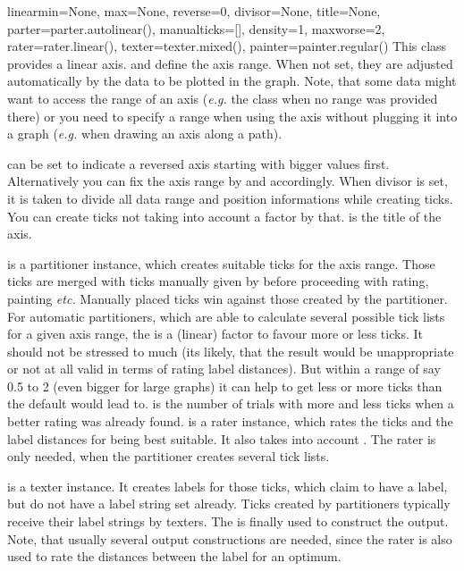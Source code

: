 \begin{classdesc}{linear}{min=None, max=None, reverse=0, divisor=None, title=None,
                          parter=parter.autolinear(), manualticks=[],
                          density=1, maxworse=2, rater=rater.linear(),
                          texter=texter.mixed(), painter=painter.regular()}
  This class provides a linear axis.  and  define the
  axis range. When not set, they are adjusted automatically by the
  data to be plotted in the graph. Note, that some data might want to
  access the range of an axis (\emph{e.g.} the  class
  when no range was provided there) or you need to specify a range
  when using the axis without plugging it into a graph (\emph{e.g.}
  when drawing an axis along a path).

   can be set to indicate a reversed axis starting with
  bigger values first. Alternatively you can fix the axis range by
   and  accordingly. When divisor is set, it is
  taken to divide all data range and position informations while
  creating ticks. You can create ticks not taking into account a
  factor by that.  is the title of the axis.

   is a partitioner instance, which creates suitable ticks
  for the axis range. Those ticks are merged with ticks manually given 
  by  before proceeding with rating, painting
  \emph{etc.} Manually placed ticks win against those created by the
  partitioner. For automatic partitioners, which are able to calculate
  several possible tick lists for a given axis range, the
   is a (linear) factor to favour more or less ticks. It
  should not be stressed to much (its likely, that the result would be
  unappropriate or not at all valid in terms of rating label
  distances). But within a range of say 0.5 to 2 (even bigger for
  large graphs) it can help to get less or more ticks than the default
  would lead to.  is the number of trials with more
  and less ticks when a better rating was already found. 
  is a rater instance, which rates the ticks and the label distances
  for being best suitable. It also takes into account .
  The rater is only needed, when the partitioner creates several tick
  lists.

   is a texter instance. It creates labels for those
  ticks, which claim to have a label, but do not have a label string
  set already. Ticks created by partitioners typically receive their
  label strings by texters. The  is finally used to
  construct the output. Note, that usually several output
  constructions are needed, since the rater is also used to rate the
  distances between the label for an optimum.
\end{classdesc}

